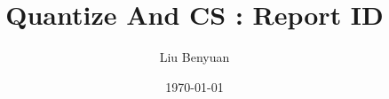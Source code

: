 \documentclass[a4paper,12pt,openany]{book}
\title{Quantize And CS : Report ID}
\author{Liu Benyuan}
\date{\today}
\begin{document}
\graphicspath{{fig/}}
\maketitle

\mainmatter



\cleardoublepage


%
%
\end{document}
